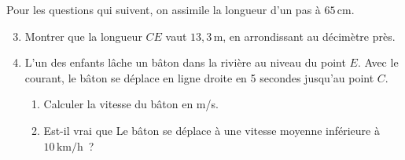 Pour les questions qui suivent, on assimile la longueur d'un pas à $65\,\text{cm}$.
\begin{enumerate}
  \setcounter{enumi}{2}
\item Montrer que la longueur $CE$ vaut $13,3\,\text{m}$, en arrondissant au décimètre près.
\item L'un des enfants lâche un bâton dans la rivière au niveau du point $E$. Avec le courant, le bâton se déplace en ligne droite en 5 secondes jusqu'au point $C$.
  \begin{enumerate}
  \item Calculer la vitesse du bâton en m/s.
  \item Est-il vrai que \og{}Le bâton se déplace à une vitesse moyenne inférieure à $10\,\text{km/h}$\fg{}~?
  \end{enumerate}
\end{enumerate}
\medskip


